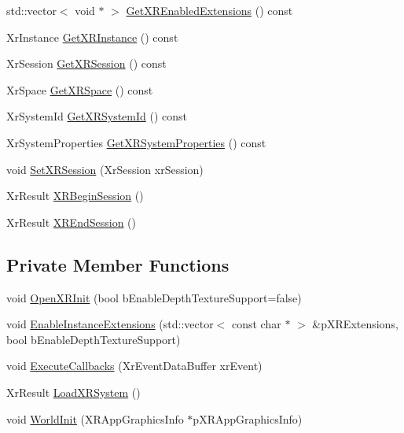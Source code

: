 \begin{DoxyCompactItemize}
\item 
std\+::vector$<$ void $\ast$ $>$ \mbox{\hyperlink{class_open_x_r_provider_1_1_x_r_core_a19d3b284191aaa25e10093e365376e5d}{Get\+X\+R\+Enabled\+Extensions}} () const
\item 
Xr\+Instance \mbox{\hyperlink{class_open_x_r_provider_1_1_x_r_core_a0c0e4697dbacf9ec226d64de4b734efd}{Get\+X\+R\+Instance}} () const
\item 
Xr\+Session \mbox{\hyperlink{class_open_x_r_provider_1_1_x_r_core_a6ceb9dd6bab3b254a0890546056068ea}{Get\+X\+R\+Session}} () const
\item 
Xr\+Space \mbox{\hyperlink{class_open_x_r_provider_1_1_x_r_core_ae09a68b60383bf9bd5866d2e7b689828}{Get\+X\+R\+Space}} () const
\item 
Xr\+System\+Id \mbox{\hyperlink{class_open_x_r_provider_1_1_x_r_core_a2ebafdf7a4329f33f5cfb7c9d3c9b2d9}{Get\+X\+R\+System\+Id}} () const
\item 
Xr\+System\+Properties \mbox{\hyperlink{class_open_x_r_provider_1_1_x_r_core_ac7f545d98dfecc2417008d2ab28e3890}{Get\+X\+R\+System\+Properties}} () const
\item 
void \mbox{\hyperlink{class_open_x_r_provider_1_1_x_r_core_a8a8ff9cd05d8343cc67bdc646063f7e8}{Set\+X\+R\+Session}} (Xr\+Session xr\+Session)
\item 
Xr\+Result \mbox{\hyperlink{class_open_x_r_provider_1_1_x_r_core_a9fd6ddde34eb71f3b41966db79b54b22}{X\+R\+Begin\+Session}} ()
\item 
Xr\+Result \mbox{\hyperlink{class_open_x_r_provider_1_1_x_r_core_a361a44f9b5cbda73bdede6c45dd6078b}{X\+R\+End\+Session}} ()
\end{DoxyCompactItemize}
\subsection*{Private Member Functions}
\begin{DoxyCompactItemize}
\item 
void \mbox{\hyperlink{class_open_x_r_provider_1_1_x_r_core_a3ef0ea6626d9e949dd9997618058a877}{Open\+X\+R\+Init}} (bool b\+Enable\+Depth\+Texture\+Support=false)
\item 
void \mbox{\hyperlink{class_open_x_r_provider_1_1_x_r_core_a8bd1bf97cb72c44c3a4dcc2e34a1fd7e}{Enable\+Instance\+Extensions}} (std\+::vector$<$ const char $\ast$ $>$ \&p\+X\+R\+Extensions, bool b\+Enable\+Depth\+Texture\+Support)
\item 
void \mbox{\hyperlink{class_open_x_r_provider_1_1_x_r_core_ab994d8927fc80a9091d6c9eb26260dfa}{Execute\+Callbacks}} (Xr\+Event\+Data\+Buffer xr\+Event)
\item 
Xr\+Result \mbox{\hyperlink{class_open_x_r_provider_1_1_x_r_core_af49a490e66fc60337ad41bbb107e82c8}{Load\+X\+R\+System}} ()
\item 
void \mbox{\hyperlink{class_open_x_r_provider_1_1_x_r_core_ad6d93e9d26622e99807338346f68c0de}{World\+Init}} (X\+R\+App\+Graphics\+Info $\ast$p\+X\+R\+App\+Graphics\+Info)
\end{DoxyCompactItemize}

